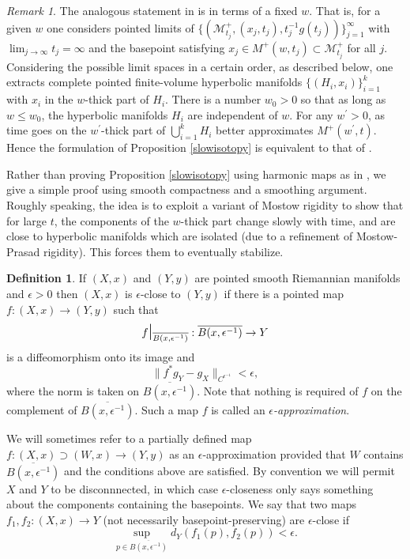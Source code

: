 \documentclass[12pt]{amsart}
\newcommand{\M}{{\mathcal M}}
\newcommand{\restr}{\mbox{\Large \(|\)\normalsize}}
\newcommand{\eps}{\epsilon}
\newcommand{\ol}{\overline}
\newcommand{\ra}{\rightarrow}
\numberwithin{equation}{section}
\theoremstyle{plain}
\theoremstyle{definition}
\newtheorem{definition}[equation]{Definition}
\theoremstyle{remark}
\newtheorem{remark}[equation]{Remark}
\begin{document}
\begin{remark}
The analogous statement in \cite[Section 7.3]{Perelman2} is in terms of a fixed $w$.
That is, for a given $w$ one considers pointed limits of
$\{(\M^+_{t_j}, (x_j, t_j), t_j^{-1} g(t_j))\}_{j=1}^\infty$
with $\lim_{j \rightarrow \infty} t_j = \infty$ and the basepoint
satisfying 
$x_j \in M^+(w, t_j) \subset \M^+_{t_j}$
for all $j$. Considering
the possible limit spaces in a certain order, as described below, 
one extracts complete pointed finite-volume hyperbolic manifolds $\{(H_i, x_i)\}_{i=1}^k$
with $x_i$ in the $w$-thick part of $H_i$. 
There is a number
$w_0 > 0$ so that as long as $w \le w_0$, the hyperbolic manifolds
$H_i$ are independent of $w$.
For any $w^\prime > 0$,
as time goes on the $w^\prime$-thick part of  $\bigcup_{i=1}^k H_i$
better approximates $M^+(w^\prime, t)$. 
Hence the formulation of
Proposition \ref{slowisotopy} is equivalent to that of
\cite[Section 7.3]{Perelman2}. 
\end{remark}

Rather than proving Proposition \ref{slowisotopy}
using harmonic maps 
as in \cite{Hamiltonn},
we give a simple proof using
smooth compactness and a smoothing argument.  Roughly speaking, the idea is
to exploit a variant of Mostow rigidity to show that for large $t$, the components
of the $w$-thick part change slowly with time, and
are close to hyperbolic manifolds which are isolated (due to a refinement
of Mostow-Prasad rigidity). This forces them to eventually stabilize.

\begin{definition}
If $(X,x)$ and $(Y,y)$ are pointed smooth Riemannian manifolds
and $\eps>0$ then $(X,x)$ is $\eps$-close to $(Y,y)$
if there is a pointed map $f:(X,x)\ra (Y,y)$ such that
\begin{equation}
f\restr_{\ol{B(x,\eps^{-1})}}:\ol{B(x,\eps^{-1})}\ra Y
\end{equation}
 is a diffeomorphism onto its image
and 
\begin{equation}
\label{fapprox}
\|f^*g_Y-g_X\|_{C^{\eps^{-1}}}<\eps,
\end{equation}
where the norm is taken on $\ol{B(x,\eps^{-1})}$.
Note that nothing is required of $f$ on the complement of $\ol{B(x,\eps^{-1})}$.
Such a map $f$ is called an {\em $\eps$-approximation}.  
\end{definition}

We will sometimes refer
to a partially defined map $f:(X,x)\supset (W,x)\ra (Y,y)$ as an
$\eps$-approximation provided that $W$ contains $\ol{B(x,\eps^{-1})}$ and
the conditions above are satisfied. By convention we will permit $X$ and $Y$ 
to be disconnnected, in which case $\eps$-closeness only says something about the
components containing the basepoints.
We say that two maps $f_1,f_2:(X,x)\ra Y$ (not necessarily basepoint-preserving) 
are $\eps$-close if
\begin{equation}
\sup_{p\in \ol{B(x,\eps^{-1})}}d_Y(f_1(p),f_2(p))<\eps.
\end{equation}
\end{document}
